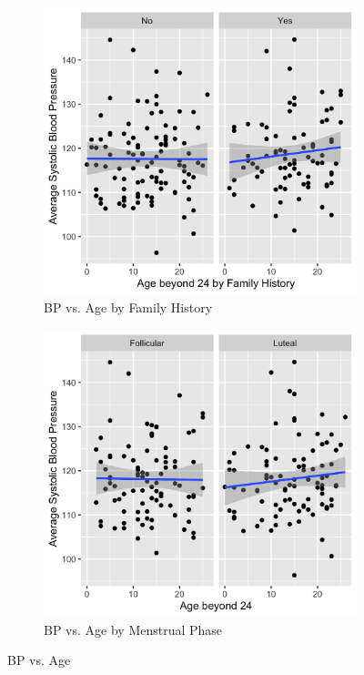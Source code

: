 \documentclass[12pt,twoside,letterpaper]{article}
\theoremstyle{definition}
\theoremstyle{definition}
\begin{document}
\begin{appendices}
\begin{figure}[h]
\begin{subfigure}[b]{0.3\textwidth}
        \includegraphics[width=\textwidth]{pics/bp by age and fh.png}
        \caption[]%
        {{\small BP vs. Age by Family History}}
        \label{fig: bp v age and fh}
        \end{subfigure}
        \hfill
        \begin{subfigure}[b]{0.3\textwidth}
        \centering
        \includegraphics[width=\textwidth]{pics/bp by age and phase.png}
        \caption[]%
        {{\small BP vs. Age by Menstrual Phase}}
        \label{fig: bp v age and phase}
        \end{subfigure}
        \caption[]
        {\small BP vs. Age}
        \label{fig: bp v age and lv 2}
        \end{figure}


\end{appendices}
\end{document}
